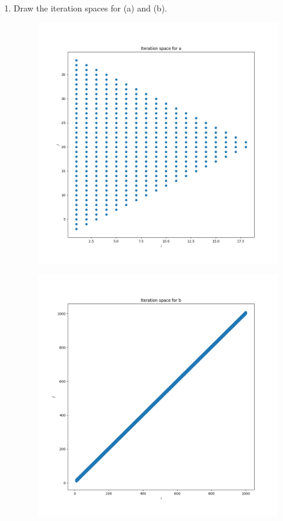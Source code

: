 \documentclass[11pt]{article}
\begin{document}
\begin{enumerate}
	\item Draw the iteration spaces for (a) and (b).
		\begin{Answer}
		\begin{figure}[H]
		    \centerline{\includegraphics[width=6in]{figures/iteration_space_a.png}}
		\end{figure}
		\begin{figure}[H]
		    \centerline{\includegraphics[width=6in]{figures/iteration_space_b.png}}

\end{figure}
\end{Answer}
\end{enumerate}
\end{document}
